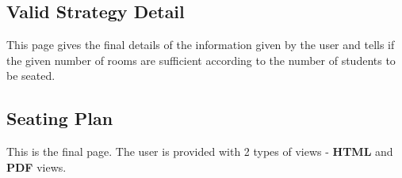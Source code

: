 

\subsection{Valid Strategy Detail}
This page gives the final details of the information given by the user 
and tells if the given number of rooms are sufficient according to the 
number of students to be seated.



\subsection{Seating Plan}
This is the final page.
The user is provided with 2 types of views - {\bf HTML} and {\bf PDF} 
views.
